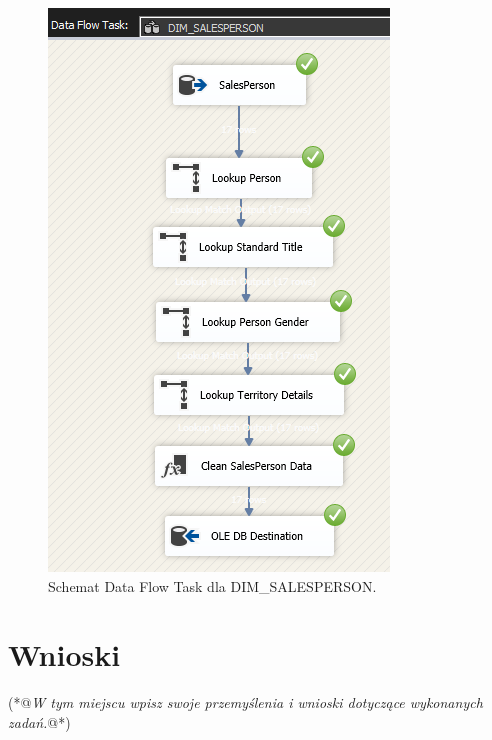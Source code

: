 \documentclass[a4paper,12pt]{article}
\begin{document}
\begin{figure}[H]
    \centering
    \includegraphics[width=\textwidth]{images/5_salesperson.png}
    \caption{Schemat Data Flow Task dla DIM\_SALESPERSON.}
\end{figure}

\section{Wnioski}

 (*@\textit{W tym miejscu wpisz swoje przemyślenia i wnioski dotyczące wykonanych zadań.}@*)



\printbibliography
\end{document}
